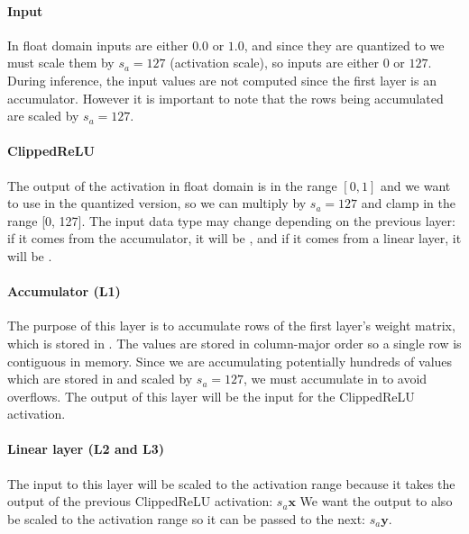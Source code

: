 \paragraph[short]{Input} In float domain inputs are either $0.0$ or $1.0$, and since they are quantized to  we must scale them by $s_a=127$ (activation scale), so inputs are either $0$ or $127$. During inference, the input values are not computed since the first layer is an accumulator. However it is important to note that the rows being accumulated are scaled by $s_a=127$.

\paragraph[short]{ClippedReLU} The output of the activation in float domain is in the range $[0, 1]$ and we want to use  in the quantized version, so we can multiply by $s_a=127$ and clamp in the range [0, 127]. The input data type may change depending on the previous layer: if it comes from the accumulator, it will be , and if it comes from a linear layer, it will be .


\paragraph[short]{Accumulator (L1)}



The purpose of this layer is to accumulate rows of the first layer's weight matrix, which is stored in . The values are stored in column-major order so a single row is contiguous in memory. Since we are accumulating potentially hundreds of values which are stored in  and scaled by $s_a=127$, we must accumulate in  to avoid overflows. The output of this layer will be the input for the ClippedReLU activation.

\paragraph[short]{Linear layer (L2 and L3)} The input to this layer will be scaled to the activation range because it takes the output of the previous ClippedReLU activation: $s_a \bm{x}$ We want the output to also be scaled to the activation range so it can be passed to the next: $s_a \bm{y}$.


